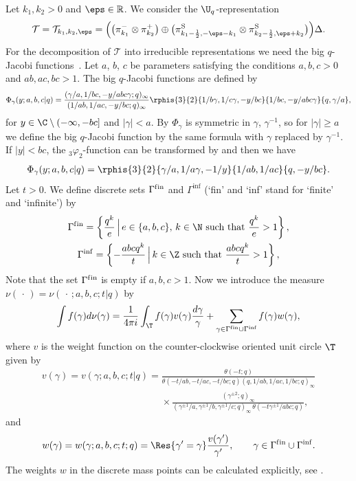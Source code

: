 Let $k_1,k_2>0$ and $\eps \in \mathbb R$. We consider the $\U_q$-representation
\begin{gather} \label{eq:defT1}
\mathcal T = \mathcal T_{k_1,k_2,\eps}= \Big(\big( \pi_{k_1}^- \otimes \pi_{k_2}^+\big) \oplus \big(\pi^{\mathrm S}_{k_1-\frac12,-\eps-k_1}  \otimes \pi_{k_2-\frac12,\eps+k_2}^{\mathrm S}\big)\Big)  \Delta.
\end{gather}
For the decomposition of $\mathcal T$ into irreducible representations we need the big $q$-Jacobi functions~\cite{KS03}. Let $a$, $b$, $c$ be parameters satisfying the conditions $a,b,c>0$ and $ab,ac,bc>1$. The big $q$-Jacobi functions are def\/ined by
\[
\Phi_\gamma(y;a,b,c|q)= \frac{ (\gamma/a, 1/bc, -y/abc\gamma;q)_\infty} { (1/ab, 1/ac, -y/bc;q)_\infty} \rphis{3}{2}{ 1/b\gamma, 1/c\gamma, -y/bc}{1/bc, -y/abc\gamma}{q, \gamma/a},
\]
for $y \in \C\setminus(-\infty, -bc]$ and $|\gamma|< a$. By \cite[(III.9)]{GRa04} $\Phi_\gamma$ is symmetric in $\gamma$, $\gamma^{-1}$, so for $|\gamma|\geq a$ we def\/ine the big $q$-Jacobi function by the same formula with $\gamma$ replaced by $\gamma^{-1}$. If $|y|<bc$, the $_3\varphi_2$-function can be transformed by \cite[(III.10)]{GRa04} and then we have
\begin{gather} \label{eq:3phi2}
\Phi_\gamma(y;a,b,c|q)= \rphis{3}{2}{\gamma/a, 1/a\gamma, -1/y}{1/ab, 1/ac}{q,-y/bc}.
\end{gather}
Let $t>0$. We def\/ine discrete sets $\Gamma^{\mathrm{f\/in}}$ and $\Gamma^{\mathrm{inf}}$ (`f\/in' and `inf' stand for `f\/inite' and `inf\/inite') by
\begin{gather*}
\Gamma^{\mathrm{f\/in}}=  \left\{ \frac{q^k}{e}\, \Big| \, e \in \{a,b,c\},\, k \in \N \text{ such that } \frac{q^k}{e}>1 \right\},\\
\Gamma^{\mathrm{inf}} = \left\{ -\frac{ abcq^k }{t}\, \Big| \, k \in \Z \text{ such that } \frac{abcq^k}{t}>1 \right\},
\end{gather*}
Note that the set $\Gamma^{\mathrm{f\/in}}$ is empty if $a,b,c>1$.
Now we introduce the measure $\nu(\,\cdot\,)=\nu(\,\cdot\,;a,b,c;t|q)$ by
\[
\int f(\gamma) d\nu(\gamma) = \frac1{4\pi i}\int_\T f(\gamma) v(\gamma) \frac{ d\gamma}{\gamma} + \sum_{\gamma \in \Gamma^{\mathrm{f\/in}} \cup \Gamma^{\mathrm{inf}}} f(\gamma)w(\gamma) ,
\]
where $v$ is the weight function on the counter-clockwise oriented unit circle $\T$ given by
\begin{gather*}
v(\gamma)=v(\gamma;a,b,c;t|q) =  \frac{ \theta(-t;q) }{\theta(-t/ab, -t/ac, -t/bc;q) (q,1/ab,1/ac,1/bc;q)_\infty}\nonumber\\
\phantom{v(\gamma)=v(\gamma;a,b,c;t|q) =}{}  \times \frac{ (\gamma^{\pm 2};q)_\infty }{ (\gamma^{\pm 1}/a, \gamma^{\pm 1}/b, \gamma^{\pm 1}/c;q)_\infty\, \theta(-t\gamma^{\pm 1}/abc;q)},%
\end{gather*}
and{\samepage
\[
w(\gamma)=w(\gamma;a,b,c;t;q) = \Res{\gamma'= \gamma} \frac{ v(\gamma') }{\gamma'}, \qquad \gamma \in \Gamma^{\mathrm{f\/in}} \cup \Gamma^{\mathrm{inf}}.
\]
The weights $w$ in the discrete mass points can be calculated explicitly, see \cite[Section~8]{KS03}.}


